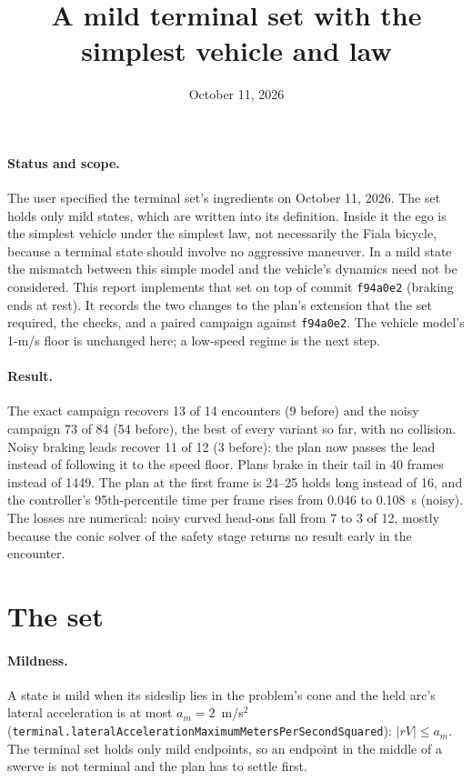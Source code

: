 \documentclass[11pt]{article}
\title{A mild terminal set with the simplest vehicle and law}
\author{}
\date{October 11, 2026}
\begin{document}
\maketitle
\paragraph{Status and scope.}
The user specified the terminal set's ingredients on October 11, 2026. The
set holds only mild states, which are written into its definition. Inside
it the ego is the simplest vehicle under the simplest law, not necessarily
the Fiala bicycle, because a terminal state should involve no aggressive
maneuver. In a mild state the mismatch between this simple model and the
vehicle's dynamics need not be considered. This report implements that set
on top of commit \texttt{f94a0e2} (braking ends at rest). It records the two
changes to the plan's extension that the set required, the checks, and a
paired campaign against \texttt{f94a0e2}. The vehicle model's 1-m/s floor is
unchanged here; a low-speed regime is the next step.

\paragraph{Result.}
The exact campaign recovers 13 of 14 encounters (9 before) and the noisy
campaign 73 of 84 (54 before), the best of every variant so far, with no
collision. Noisy braking leads recover 11 of 12 (3 before): the plan now
passes the lead instead of following it to the speed floor. Plans brake
in their tail in 40 frames instead of 1449. The plan at the first frame is
24--25 holds long instead of 16, and the controller's 95th-percentile time
per frame rises from 0.046 to 0.108~s (noisy). The losses are numerical:
noisy curved head-ons fall from 7 to 3 of 12, mostly because the
conic solver of the safety stage returns no result early in the encounter.

\section{The set}
\paragraph{Mildness.}
A state is mild when its sideslip lies in the problem's cone and the held
arc's lateral acceleration is at most
$a_m=2$~m/s$^2$
(\texttt{terminal.lateralAccelerationMaximumMetersPerSecondSquared}):
$|rV|\le a_m$. The terminal set holds only mild endpoints, so an endpoint
in the middle of a swerve is not terminal and the plan has to settle first.
\end{document}
